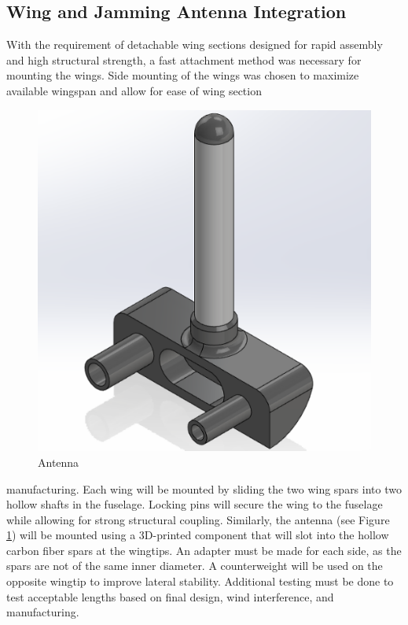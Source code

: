 \subsection{Wing and Jamming Antenna Integration}
With the requirement of detachable wing sections designed for rapid assembly and high structural strength, a fast attachment method was necessary for mounting the wings. Side mounting of the wings was chosen to maximize available wingspan and allow for ease of wing section \begin{figure}
   \centering
    \includegraphics[width=\linewidth]{Images/ant_CAD.png}
   \caption{Antenna}
   \label{fig:ant}
\end{figure}
manufacturing. Each wing will be mounted by sliding the two wing spars into two hollow shafts in the fuselage. Locking pins will secure the wing to the fuselage while allowing for strong structural coupling. Similarly, the antenna (see Figure \ref{fig:ant}) will be mounted using a 3D-printed component that will slot into the hollow carbon fiber spars at the wingtips. An adapter must be made for each side, as the spars are not of the same inner diameter. A counterweight will be used on the opposite wingtip to improve lateral stability. Additional testing must be done to test acceptable lengths based on final design, wind interference, and manufacturing.

